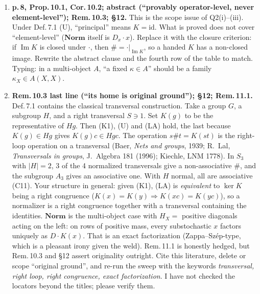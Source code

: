 \documentclass[11pt]{article}
\newcommand{\Norm}{\mathbf{Norm}}
\renewcommand{\Im}{\operatorname{Im}}
\begin{document}
\begin{enumerate}[label=\textbf{M\arabic*.},leftmargin=*]
\item \textbf{p.\,8, Prop.\,10.1, Cor.\,10.2; abstract (``provably operator-level, never
  element-level''); Rem.\,10.3; \S12.} This is the scope issue of Q2(i)--(iii). Under Def.\,7.1 (U),
  ``principal'' means $K=\mathrm{id}$. What is proved does not cover ``element-level''
  ($\Norm$ itself is $D_x\cdot x$). Replace it with the closure criterion: if $\Im K$ is closed under
  $\cdot$, then $\#=\cdot|_{\Im K}$, so a handed $K$ has a non-closed image. Rewrite the abstract
  clause and the fourth row of the table to match. Typing: in a multi-object $A$, ``a fixed
  $\kappa\in A$'' should be a family $\kappa_X\in A(X,X)$.
\item \textbf{Rem.\,10.3 last line (``its home is original ground''); \S12; Rem.\,11.1.}
  Def.\,7.1 contains the classical transversal construction. Take a group $G$, a subgroup $H$, and a
  right transversal $S\ni 1$. Set $K(g)$ to be the representative of $Hg$. Then (K1), (U) and (LA)
  hold, the last because $K(g)\in Hg$ gives $K(g)c\in Hgc$. The operation $s\#t=K(st)$ is the
  right-loop operation on a transversal (Baer, \emph{Nets and groups}, 1939; R.\ Lal,
  \emph{Transversals in groups}, J.\ Algebra 181 (1996); Kiechle, LNM 1778). In $S_3$ with $|H|=2$,
  3 of the 4 normalized transversals give a non-associative $\#$, and the subgroup $A_3$ gives an
  associative one. With $H$ normal, all are associative (C11). Your structure in general: given (K1),
  (LA) is \emph{equivalent} to $\ker K$ being a right congruence ($K(x)=K(y)\Rightarrow K(xc)=K(yc)$),
  so a normalizer is a right congruence together with a transversal containing the identities.
  $\Norm$ is the multi-object case with $H_X=$ positive diagonals acting on the left: on rows of
  positive mass, every substochastic $x$ factors uniquely as $D\cdot K(x)$. That is an exact
  factorization (Zappa--Szép-type, which is a pleasant irony given the weld). Rem.\,11.1 is honestly
  hedged, but Rem.\,10.3 and \S12 assert originality outright. Cite this literature, delete or scope
  ``original ground'', and re-run the sweep with the keywords \emph{transversal, right loop,
  right congruence, exact factorization}. I have not checked the locators beyond the titles; please
  verify them.
\end{enumerate}
\end{document}
